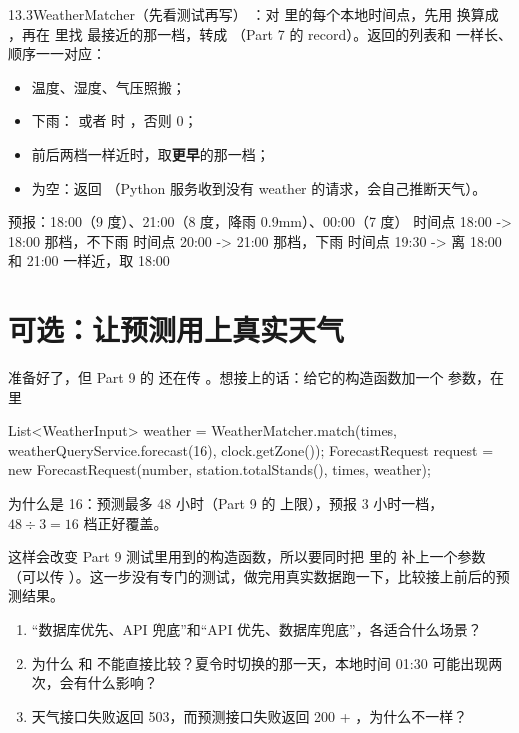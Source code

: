 \begin{task}{13.3\quad WeatherMatcher（先看测试再写）}
：对  里的每个本地时间点，先用  换算成 ，再在  里找  最接近的那一档，转成 （Part 7 的 record）。返回的列表和  一样长、顺序一一对应：
\begin{itemize}
  \item 温度、湿度、气压照搬；
  \item 下雨： 或者  时 ，否则 0；
  \item 前后两档一样近时，取\textbf{更早}的那一档；
  \item {} 为空：返回 （Python 服务收到没有 weather 的请求，会自己推断天气）。
\end{itemize}

\begin{example}
\begin{plaincode}
预报：18:00（9 度）、21:00（8 度，降雨 0.9mm）、00:00（7 度）
时间点 18:00 -> 18:00 那档，不下雨
时间点 20:00 -> 21:00 那档，下雨
时间点 19:30 -> 离 18:00 和 21:00 一样近，取 18:00
\end{plaincode}
\end{example}
\end{task}

\section{可选：让预测用上真实天气}

 准备好了，但 Part 9 的  还在传 。想接上的话：给它的构造函数加一个  参数，在  里

\begin{java}
List<WeatherInput> weather = WeatherMatcher.match(times, weatherQueryService.forecast(16), clock.getZone());
ForecastRequest request = new ForecastRequest(number, station.totalStands(), times, weather);
\end{java}

为什么是 16：预测最多 48 小时（Part 9 的  上限），预报 3 小时一档，$48 \div 3 = 16$ 档正好覆盖。

这样会改变 Part 9 测试里用到的构造函数，所以要同时把  里的  补上一个参数（可以传 ）。这一步没有专门的测试，做完用真实数据跑一下，比较接上前后的预测结果。

\begin{think}
\begin{enumerate}
  \item “数据库优先、API 兜底”和“API 优先、数据库兜底”，各适合什么场景？
  \item 为什么  和  不能直接比较？夏令时切换的那一天，本地时间 01:30 可能出现两次，会有什么影响？
  \item 天气接口失败返回 503，而预测接口失败返回 200 + ，为什么不一样？
\end{enumerate}
\end{think}
